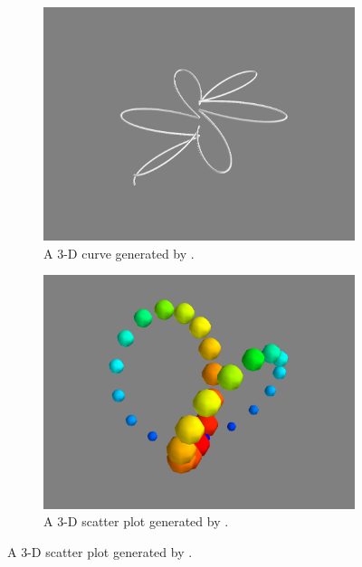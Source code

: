 \begin{figure} %
\captionsetup[subfigure]{justification=centering}
\centering
\begin{subfigure}{.5\textwidth}
    \centering
    \includegraphics[width=\linewidth]{plot3d.png}
    \caption{A 3-D curve generated by .}
    \label{fig:plot3d}
\end{subfigure}%
\begin{subfigure}{.5\textwidth}
    \centering
    \includegraphics[width=\linewidth]{points3d.png}
    \caption{A 3-D scatter plot generated by .}
    \label{fig:points3d}
\end{subfigure}
\end{figure}

